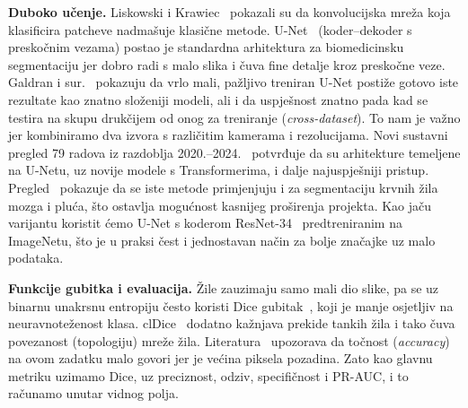 \textbf{Duboko učenje.} Liskowski i Krawiec~\cite{liskowski2016} pokazali su da konvolucijska mreža koja klasificira patcheve nadmašuje klasične metode. U-Net~\cite{ronneberger2015} (koder--dekoder s preskočnim vezama) postao je standardna arhitektura za biomedicinsku segmentaciju jer dobro radi s malo slika i čuva fine detalje kroz preskočne veze. Galdran i sur.~\cite{galdran2022} pokazuju da vrlo mali, pažljivo treniran U-Net postiže gotovo iste rezultate kao znatno složeniji modeli, ali i da uspješnost znatno pada kad se testira na skupu drukčijem od onog za treniranje (\emph{cross-dataset}). To nam je važno jer kombiniramo dva izvora s različitim kamerama i rezolucijama. Novi sustavni pregled 79 radova iz razdoblja 2020.--2024.~\cite{liu2025review} potvrđuje da su arhitekture temeljene na U-Netu, uz novije modele s Transformerima, i dalje najuspješniji pristup. Pregled~\cite{du2024review} pokazuje da se iste metode primjenjuju i za segmentaciju krvnih žila mozga i pluća, što ostavlja mogućnost kasnijeg proširenja projekta. Kao jaču varijantu koristit ćemo U-Net s koderom ResNet-34~\cite{he2016} predtreniranim na ImageNetu, što je u praksi čest i jednostavan način za bolje značajke uz malo podataka.

\textbf{Funkcije gubitka i evaluacija.} Žile zauzimaju samo mali dio slike, pa se uz binarnu unakrsnu entropiju često koristi Dice gubitak~\cite{milletari2016}, koji je manje osjetljiv na neuravnoteženost klasa. clDice~\cite{shit2021} dodatno kažnjava prekide tankih žila i tako čuva povezanost (topologiju) mreže žila. Literatura~\cite{moccia2018,galdran2022} upozorava da točnost (\emph{accuracy}) na ovom zadatku malo govori jer je većina piksela pozadina. Zato kao glavnu metriku uzimamo Dice, uz preciznost, odziv, specifičnost i PR-AUC, i to računamo unutar vidnog polja.
